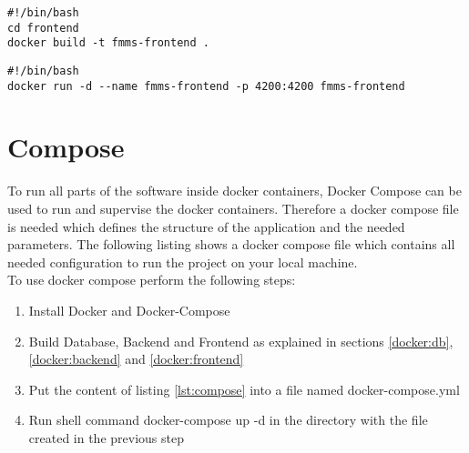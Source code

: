 \begin{lstlisting}[caption={Build Frontend Container}]
#!/bin/bash
cd frontend
docker build -t fmms-frontend .
\end{lstlisting}

\begin{lstlisting}[caption={Run Frontend Container}]
#!/bin/bash
docker run -d --name fmms-frontend -p 4200:4200 fmms-frontend
\end{lstlisting}



\section{Compose}
To run all parts of the software inside docker containers, Docker Compose can be used to run and supervise the docker containers.
Therefore a docker compose file is needed which defines the structure of the application and the needed parameters.
The following listing shows a docker compose file which contains all needed configuration to run the project on your local machine.
~\\
To use docker compose perform the following steps:
\begin{enumerate}
	\item Install Docker and Docker-Compose
	\item Build Database, Backend and Frontend as explained in sections \ref{docker:db}, \ref{docker:backend} and \ref{docker:frontend}
	\item Put the content of listing \ref{lst:compose} into a file named \glqq docker-compose.yml\grqq
	\item Run shell command \glqq docker-compose up -d\grqq{} in the directory with the file created in the previous step
\end{enumerate}


\begin{minipage}{\textwidth}
	
\end{minipage}
